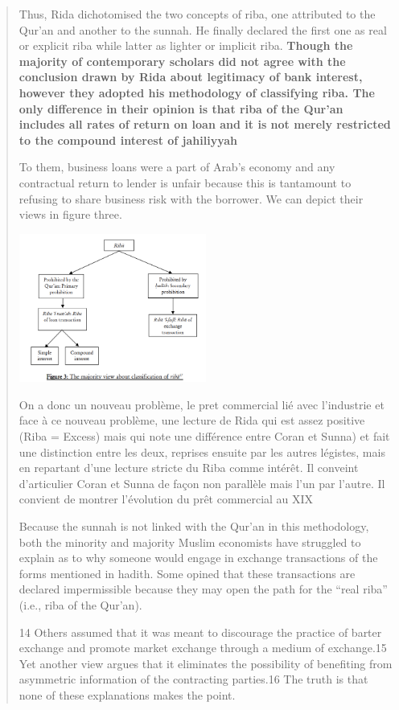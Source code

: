 \begin{quote}
Thus, Rida dichotomised the two concepts of riba, one attributed to the Qur'an and another to the sunnah. He finally declared the first one as real or explicit riba while latter as lighter or implicit riba.
\textbf{
Though the majority of contemporary scholars did not agree with the conclusion drawn by Rida about legitimacy of bank interest, however they adopted his methodology of classifying riba. The only difference in their opinion is that riba of the Qur'an includes all rates of return on loan and it is not merely restricted to the compound interest of jahiliyyah}


To them, business loans were a part of Arab's economy and any contractual return to lender is unfair because this is tantamount to refusing to share business risk with the borrower. We can depict their views in figure three.


\includegraphics[width=0.5\textwidth]{CourantsIslamContemporain/ImagesCourantsIslamContemporain/RibaMajority.png}
\begin{Synthesis}
On a donc un nouveau problème, le pret commercial lié avec l'industrie et face à ce nouveau problème, une lecture de Rida qui est assez positive (Riba = Excess) mais qui note une différence entre Coran et Sunna) et fait une distinction entre les deux, reprises ensuite par les autres légistes, mais en repartant d'une lecture stricte du Riba comme intérêt. Il conveint d'articulier Coran et Sunna de façon non parallèle mais l'un par l'autre.
Il convient de montrer l'évolution du prêt commercial au XIX
\end{Synthesis}
Because the sunnah is not linked with the Qur'an in this methodology, both the minority and majority Muslim economists have struggled to explain as to why someone would engage in exchange transactions of the forms mentioned in hadith. Some opined that these transactions are declared impermissible because they may open the path for the “real riba” (i.e., riba of the Qur'an).


14 Others assumed that it was meant to discourage the practice of barter exchange and promote market exchange through a medium of exchange.15 Yet another view argues that it eliminates the possibility of benefiting from asymmetric information of the contracting parties.16 The truth is that none of these explanations makes the point.


\end{quote}
